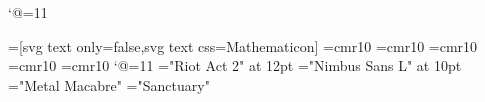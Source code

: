 \catcode`@=11\relax






\def\imageFolder{/media/Main/TeX/Mathematicon}
\ifHtml
	
	=[svg text only=false,svg text css=Mathematicon]%
	\font\LD@Font@Tiny=cmr10\relax
	\font\LD@Font@Inferno=cmr10\relax
	\font\LD@Font@Arial=cmr10\relax
	\font\LD@Font@Gothic=cmr10\relax
	\font\LD@Font@Sanctuary=cmr10\relax
\else
	\LD@AFour@Book
	\catcode`@=11\relax
	\let\LD@Font@Tiny\fiverm\relax
	\font\LD@Font@Inferno="Riot Act 2" at 12pt\relax
	\font\LD@Font@Arial="Nimbus Sans L" at 10pt\relax
	\font\LD@Font@Gothic="Metal Macabre"\relax
	\font\LD@Font@Sanctuary="Sanctuary"\relax
\fi
\tenrm






